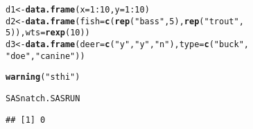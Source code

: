 \documentclass[10pt]{report}
\makeatletter
\newcommand{\hlnum}[1]{\textcolor[rgb]{0.686,0.059,0.569}{#1}}%
\newcommand{\hlstr}[1]{\textcolor[rgb]{0.192,0.494,0.8}{#1}}%
\newcommand{\hlopt}[1]{\textcolor[rgb]{0,0,0}{#1}}%
\newcommand{\hlstd}[1]{\textcolor[rgb]{0.345,0.345,0.345}{#1}}%
\newcommand{\hlkwb}[1]{\textcolor[rgb]{0.69,0.353,0.396}{#1}}%
\newcommand{\hlkwc}[1]{\textcolor[rgb]{0.333,0.667,0.333}{#1}}%
\newcommand{\hlkwd}[1]{\textcolor[rgb]{0.737,0.353,0.396}{\textbf{#1}}}%
\newenvironment{kframe}{%
 \def\at@end@of@kframe{}%
 \ifinner\ifhmode%
  \def\at@end@of@kframe{\end{minipage}}%
  \begin{minipage}{\columnwidth}%
 \fi\fi%
 \def\FrameCommand##1{\hskip\@totalleftmargin \hskip-\fboxsep
 \colorbox{shadecolor}{##1}\hskip-\fboxsep
     \hskip-\linewidth \hskip-\@totalleftmargin \hskip\columnwidth}%
 \MakeFramed {\advance\hsize-\width
   \@totalleftmargin\z@ \linewidth\hsize
   \@setminipage}}%
 {\par\unskip\endMakeFramed%
 \at@end@of@kframe}
\newenvironment{knitrout}{}{} %
\makeatother
\begin{document}
\begin{knitrout}
\color{fgcolor}\begin{kframe}
\begin{alltt}
\hlstd{d1} \hlkwb{<-} \hlkwd{data.frame}\hlstd{(}\hlkwc{x} \hlstd{=} \hlnum{1}\hlopt{:}\hlnum{10}\hlstd{,} \hlkwc{y} \hlstd{=} \hlnum{1}\hlopt{:}\hlnum{10}\hlstd{)}
\hlstd{d2} \hlkwb{<-} \hlkwd{data.frame}\hlstd{(}\hlkwc{fish} \hlstd{=} \hlkwd{c}\hlstd{(}\hlkwd{rep}\hlstd{(}\hlstr{"bass"}\hlstd{,} \hlnum{5}\hlstd{),} \hlkwd{rep}\hlstd{(}\hlstr{"trout"}\hlstd{,}
    \hlnum{5}\hlstd{)),} \hlkwc{wts} \hlstd{=} \hlkwd{rexp}\hlstd{(}\hlnum{10}\hlstd{))}
\hlstd{d3} \hlkwb{<-} \hlkwd{data.frame}\hlstd{(}\hlkwc{deer} \hlstd{=} \hlkwd{c}\hlstd{(}\hlstr{"y"}\hlstd{,} \hlstr{"y"}\hlstd{,} \hlstr{"n"}\hlstd{),} \hlkwc{type} \hlstd{=} \hlkwd{c}\hlstd{(}\hlstr{"buck"}\hlstd{,}
    \hlstr{"doe"}\hlstd{,} \hlstr{"canine"}\hlstd{))}
\end{alltt}
\end{kframe}
\end{knitrout}






\begin{knitrout}
\color{fgcolor}\begin{kframe}
\begin{alltt}
\hlkwd{warning}\hlstd{(}\hlstr{"sthi"}\hlstd{)}
\end{alltt}


{\ttfamily\noindent\color{warningcolor}{\#\# Warning: sthi}}\begin{alltt}
\hlstd{SASnatch.SASRUN}
\end{alltt}
\begin{verbatim}
## [1] 0
\end{verbatim}
\end{kframe}
\end{knitrout}
\end{document}

